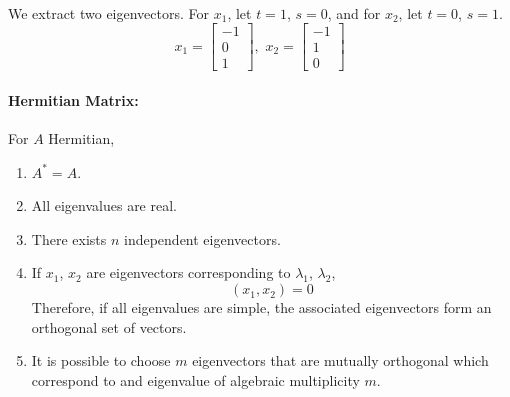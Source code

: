 \documentclass{article}
\begin{document}
\paragraph{}We extract two eigenvectors. For $x_1$, let $t = 1$, $s = 0$, and for $x_2$, let $t=0$, $s=1$.
\[
    x_1 =
    \begin{bmatrix}
        -1 \\ 0 \\ 1
    \end{bmatrix},
    \,\,
    x_2 = 
    \begin{bmatrix}
        -1 \\ 1 \\ 0
    \end{bmatrix}
\]
\paragraph{Hermitian Matrix:}For $A$ Hermitian, 

\begin{enumerate}
    \item $A^* = A$.
    \item All eigenvalues are real.
    \item There exists $n$ independent eigenvectors.
    \item If $x_1$, $x_2$ are eigenvectors corresponding to $\lambda_1$, $\lambda_2$,
        \[
            (x_1, x_2) = 0
        \]
        Therefore, if all eigenvalues are simple, the associated eigenvectors form an 
        orthogonal set of vectors.
    \item It is possible to choose $m$ eigenvectors that are mutually orthogonal which correspond to
        and eigenvalue of algebraic multiplicity $m$.
\end{enumerate}
\end{document}
